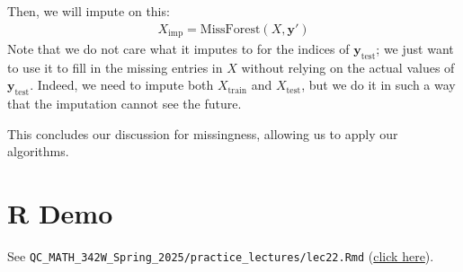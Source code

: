 \documentclass[12pt, a4paper]{article}
\theoremstyle{definition}
\begin{document}
	Then, we will impute on this:
	\begin{align*}
		X_{\text{imp}} = \text{MissForest}(X, \bm{y}')
	\end{align*}
	Note that we do not care what it imputes to for the indices of $\bm{y}_{\text{test}}$;
	we just want to use it to fill in the missing entries in $X$ without relying on the
	actual values of $\bm{y}_{\text{test}}$. Indeed, we need to impute both $X_{\text{train}}$
	and $X_{\text{test}}$, but we do it in such a way that the imputation cannot
	see the future.
	
	This concludes our discussion for missingness, allowing us to apply our algorithms.
	\section{R Demo}
	See \verb|QC_MATH_342W_Spring_2025/practice_lectures/lec22.Rmd|
	(\href{https://github.com/kapelner/QC_MATH_342W_Spring_2025/blob/main/practice_lectures/lec22.Rmd}{click here}).
\end{document}
